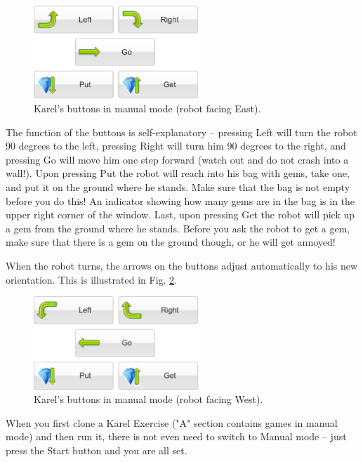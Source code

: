 \begin{figure}[!ht]
\begin{center}
\includegraphics[width=6.2cm]{imgk/buttons-all.png}
\vspace{-0mm}
\caption{Karel's buttons in manual mode (robot facing East).}
\label{fig:buttons}
\end{center}
\end{figure}
\noindent
The function of the buttons is self-explanatory -- pressing Left will turn the robot 90 degrees to the left,
pressing Right will turn him 90 degrees to the right, and pressing Go will move him one step forward 
(watch out and do not crash into a wall!). Upon pressing Put the robot will reach into his bag with gems, 
take one, and put it on the ground where he stands. Make sure that the bag is not empty before you do this!
An indicator showing how many gems are in the bag is in the upper right corner of the window. Last, upon pressing 
Get the robot will pick up a gem from the ground where he stands. Before you ask the robot to get a gem,
make sure that there is a gem on the ground though, or he will get annoyed!

When the robot turns, the arrows on the buttons adjust automatically to his new 
orientation. This is illustrated in Fig. \ref{fig:buttons2}.
\begin{figure}[!ht]
\begin{center}
\includegraphics[width=6.2cm]{imgk/buttons-all-2.png}
\vspace{-0mm}
\caption{Karel's buttons in manual mode (robot facing West).}
\label{fig:buttons2}
\end{center}
\end{figure}

\noindent
When you first clone a Karel Exercise ("A" section contains 
games in manual mode) and then 
run it, there is not even need to switch to Manual mode -- just press the Start button and you are 
all set.

